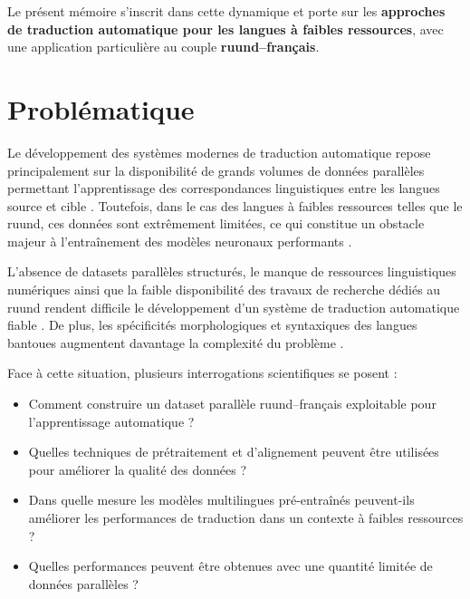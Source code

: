Le présent mémoire s'inscrit dans cette dynamique et porte sur les \textbf{approches de traduction automatique pour les langues à faibles ressources}, avec une application particulière au couple \textbf{ruund--français}.

\section{Problématique}

Le développement des systèmes modernes de traduction automatique repose principalement sur la disponibilité de grands volumes de données parallèles permettant l'apprentissage des correspondances linguistiques entre les langues source et cible \cite{ranathunga2023neural}. Toutefois, dans le cas des langues à faibles ressources telles que le ruund, ces données sont extrêmement limitées, ce qui constitue un obstacle majeur à l'entraînement des modèles neuronaux performants \cite{haulai2023construction, agyei2024low}.

L'absence de datasets parallèles structurés, le manque de ressources linguistiques numériques ainsi que la faible disponibilité des travaux de recherche dédiés au ruund rendent difficile le développement d'un système de traduction automatique fiable \cite{jindal2017building, haulai2023construction}. De plus, les spécificités morphologiques et syntaxiques des langues bantoues augmentent davantage la complexité du problème \cite{chen-fazio-2021-morphologically, toraman2022impact, aci2025morphological}.

Face à cette situation, plusieurs interrogations scientifiques se posent :

\begin{itemize}
    \item Comment construire un dataset parallèle ruund--français exploitable pour l'apprentissage automatique ?
    
    \item Quelles techniques de prétraitement et d'alignement peuvent être utilisées pour améliorer la qualité des données  ?
    
    \item Dans quelle mesure les modèles multilingues pré-entraînés peuvent-ils améliorer les performances de traduction dans un contexte à faibles ressources ?
    
    \item Quelles performances peuvent être obtenues avec une quantité limitée de données parallèles ?
\end{itemize}

